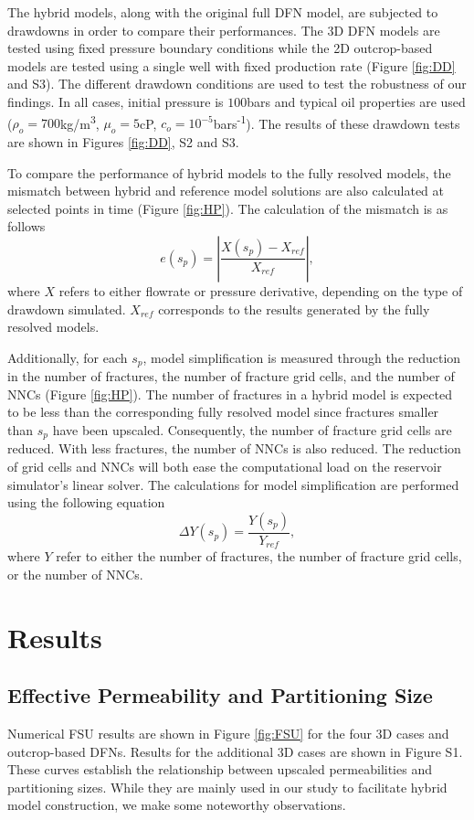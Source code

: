 \documentclass[draft]{agujournal2018}
\begin{document}
The hybrid models, along with the original full DFN model, are subjected to drawdowns in order to compare their performances. The 3D DFN models are tested using fixed pressure boundary conditions while the 2D outcrop-based models are tested using a single well with fixed production rate (Figure \ref{fig:DD} and S3). The different drawdown conditions are used to test the robustness of our findings. In all cases, initial pressure is $100$bars and typical oil properties are used ($\rho_o=700$kg/m\textsuperscript{3}, $\mu_o=5$cP, $c_o=10^{-5}$bars\textsuperscript{-1}). The results of these drawdown tests are shown in Figures \ref{fig:DD}, S2 and S3. 

To compare the performance of hybrid models to the fully resolved models, the mismatch between hybrid and reference model solutions are also calculated at selected points in time (Figure \ref{fig:HP}).  The calculation of the mismatch is as follows
\begin{equation}
e(s_p)=\left|\frac{X(s_p)-X_{ref}}{X_{ref}}\right|,
\end{equation}
where $X$ refers to either flowrate or pressure derivative, depending on the type of drawdown simulated. $X_{ref}$ corresponds to the results generated by the fully resolved models.

Additionally, for each $s_p$, model simplification is measured through the reduction in the number of fractures, the number of fracture grid cells, and the number of NNCs (Figure \ref{fig:HP}). The number of fractures in a hybrid model is expected to be less than the corresponding fully resolved model since fractures smaller than $s_p$ have been upscaled. Consequently, the number of fracture grid cells are reduced. With less fractures, the number of NNCs is also reduced. The reduction of grid cells and NNCs will both ease the computational load on the reservoir simulator's linear solver. The calculations for model simplification are performed using the following equation
\begin{equation}
\Delta Y(s_p) = \frac{Y(s_p)}{Y_{ref}},
\end{equation}
where $Y$ refer to either the number of fractures, the number of fracture grid cells, or the number of NNCs.

\section{Results}
\subsection{Effective Permeability and Partitioning Size}
Numerical FSU results are shown in Figure \ref{fig:FSU} for the four 3D cases and outcrop-based DFNs. Results for the additional 3D cases are shown in Figure S1. These curves establish the relationship between upscaled permeabilities and partitioning sizes. While they are mainly used in our study to facilitate hybrid model construction, we make some noteworthy observations.
\end{document}
